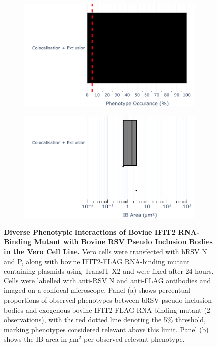 \begin{figure}
    \begin{subfigure}{0.495\textwidth}
        \caption{}
        \includegraphics[width=1\linewidth]{09. Chapter 4/Figs/01. pIB/03. IFIT2/05. IFIT2-RNA binding mutant/02. pIB/04. bar_bi2f24_bnbp.pdf} 
    \end{subfigure}
    \begin{subfigure}{0.495\textwidth}
        \caption{}
        \includegraphics[width=1\linewidth]{09. Chapter 4/Figs/01. pIB/03. IFIT2/05. IFIT2-RNA binding mutant/02. pIB/05. box_bi2f24_bnbp.pdf}
    \end{subfigure}
    \caption[Diverse Phenotypic Interactions of Bovine IFIT2 RNA-Binding Mutant with Bovine RSV Pseudo Inclusion Bodies in the Vero Cell Line.]{\textbf{Diverse Phenotypic Interactions of Bovine IFIT2 RNA-Binding Mutant with Bovine RSV Pseudo Inclusion Bodies in the Vero Cell Line.} Vero cells were transfected with bRSV N and P, along with bovine IFIT2-FLAG RNA-binding mutant containing plasmids using TransIT-X2 and were fixed after 24 hours. Cells were labelled with anti-RSV N and anti-FLAG antibodies and imaged on a confocal microscope. Panel (a) shows percentual proportions of observed phenotypes between bRSV pseudo inclusion bodies and exogenous bovine IFIT2-FLAG RNA-binding mutant (2 observations), with the red dotted line denoting the 5\% threshold, marking phenotypes considered relevant above this limit. Panel (b) shows the IB area in \(\mu \mbox{m}^2\) per observed relevant phenotype.}
    \label{fig:Diverse Phenotypic Interactions of Bovine IFIT2 RNA-Binding Mutant with Bovine RSV Pseudo Inclusion Bodies in the Vero Cell Line}
\end{figure}

